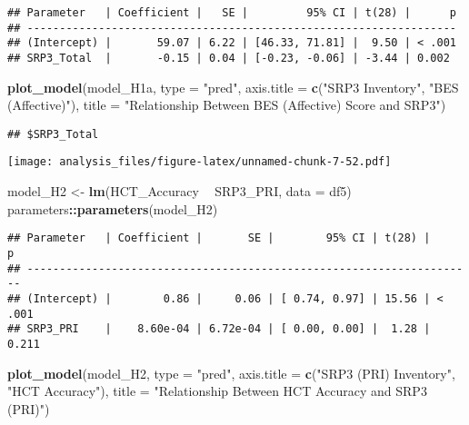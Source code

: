 \documentclass[
]{article}
\newenvironment{Shaded}{\begin{snugshade}}{\end{snugshade}}
\newcommand{\DataTypeTok}[1]{\textcolor[rgb]{0.13,0.29,0.53}{#1}}
\newcommand{\KeywordTok}[1]{\textcolor[rgb]{0.13,0.29,0.53}{\textbf{#1}}}
\newcommand{\NormalTok}[1]{#1}
\newcommand{\OperatorTok}[1]{\textcolor[rgb]{0.81,0.36,0.00}{\textbf{#1}}}
\newcommand{\StringTok}[1]{\textcolor[rgb]{0.31,0.60,0.02}{#1}}
\begin{document}
\begin{verbatim}
## Parameter   | Coefficient |   SE |         95% CI | t(28) |      p
## ------------------------------------------------------------------
## (Intercept) |       59.07 | 6.22 | [46.33, 71.81] |  9.50 | < .001
## SRP3_Total  |       -0.15 | 0.04 | [-0.23, -0.06] | -3.44 | 0.002
\end{verbatim}

\begin{Shaded}
\begin{Highlighting}[]
\KeywordTok{plot_model}\NormalTok{(model_H1a, }\DataTypeTok{type =} \StringTok{"pred"}\NormalTok{, }\DataTypeTok{axis.title =} \KeywordTok{c}\NormalTok{(}\StringTok{"SRP3 Inventory"}\NormalTok{, }\StringTok{"BES (Affective)"}\NormalTok{), }\DataTypeTok{title =} \StringTok{"Relationship Between BES (Affective) Score and SRP3"}\NormalTok{)}
\end{Highlighting}
\end{Shaded}

\begin{verbatim}
## $SRP3_Total
\end{verbatim}

\texttt{[image: analysis\_files/figure-latex/unnamed-chunk-7-52.pdf]}

\begin{Shaded}
\begin{Highlighting}[]
\NormalTok{model_H2 <-}\StringTok{ }\KeywordTok{lm}\NormalTok{(HCT_Accuracy }\OperatorTok{~}\StringTok{  }\NormalTok{SRP3_PRI, }\DataTypeTok{data =}\NormalTok{ df5)}
\NormalTok{parameters}\OperatorTok{::}\KeywordTok{parameters}\NormalTok{(model_H2)}
\end{Highlighting}
\end{Shaded}

\begin{verbatim}
## Parameter   | Coefficient |       SE |        95% CI | t(28) |      p
## ---------------------------------------------------------------------
## (Intercept) |        0.86 |     0.06 | [ 0.74, 0.97] | 15.56 | < .001
## SRP3_PRI    |    8.60e-04 | 6.72e-04 | [ 0.00, 0.00] |  1.28 | 0.211
\end{verbatim}

\begin{Shaded}
\begin{Highlighting}[]
\KeywordTok{plot_model}\NormalTok{(model_H2, }\DataTypeTok{type =} \StringTok{"pred"}\NormalTok{, }\DataTypeTok{axis.title =} \KeywordTok{c}\NormalTok{(}\StringTok{"SRP3 (PRI) Inventory"}\NormalTok{, }\StringTok{"HCT Accuracy"}\NormalTok{), }\DataTypeTok{title =} \StringTok{"Relationship Between HCT Accuracy and SRP3 (PRI)"}\NormalTok{)}
\end{Highlighting}
\end{Shaded}
\end{document}
